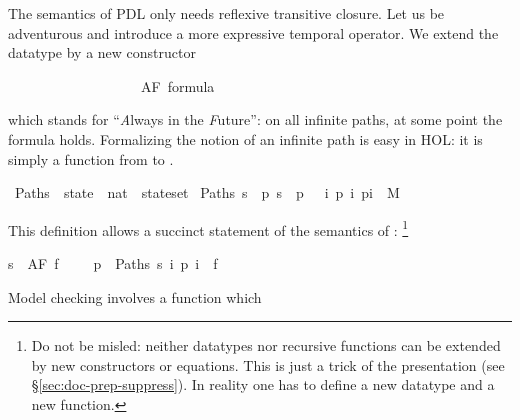 %
\begin{isabellebody}%
\def\isabellecontext{CTL}%
%
\isadelimtheory
%
\endisadelimtheory
%
\isatagtheory
%
\endisatagtheory
{\isafoldtheory}%
%
\isadelimtheory
%
\endisadelimtheory
%
\isamarkuptrue%
%
\begin{isamarkuptext}%
\label{sec:CTL}
%
The semantics of PDL only needs reflexive transitive closure.
Let us be adventurous and introduce a more expressive temporal operator.
We extend the datatype
 by a new constructor%
\end{isamarkuptext}%
\isamarkuptrue%
\ \ \ \ \ \ \ \ \ \ \ \ \ \ \ \ \ \ {\isacharbar}\ AF\ formula%
\begin{isamarkuptext}%
\noindent
which stands for ``\emph{A}lways in the \emph{F}uture'':
on all infinite paths, at some point the formula holds.
Formalizing the notion of an infinite path is easy
in HOL: it is simply a function from  to .%
\end{isamarkuptext}%
\isamarkuptrue%
\isamarkupfalse%
\ Paths\ {\isacharcolon}{\isacharcolon}\ {\isachardoublequoteopen}state\ {\isasymRightarrow}\ {\isacharparenleft}nat\ {\isasymRightarrow}\ state{\isacharparenright}set{\isachardoublequoteclose}\ \isanewline
{\isachardoublequoteopen}Paths\ s\ {\isasymequiv}\ {\isacharbraceleft}p{\isachardot}\ s\ {\isacharequal}\ p\ {}\ {\isasymand}\ {\isacharparenleft}{\isasymforall}i{\isachardot}\ {\isacharparenleft}p\ i{\isacharcomma}\ p{\isacharparenleft}i{\isacharplus}{}{\isacharparenright}{\isacharparenright}\ {\isasymin}\ M{\isacharparenright}{\isacharbraceright}{\isachardoublequoteclose}%
\begin{isamarkuptext}%
\noindent
This definition allows a succinct statement of the semantics of :
\footnote{Do not be misled: neither datatypes nor recursive functions can be
extended by new constructors or equations. This is just a trick of the
presentation (see \S\ref{sec:doc-prep-suppress}). In reality one has to define
a new datatype and a new function.}%
\end{isamarkuptext}%
\isamarkuptrue%
{\isachardoublequoteopen}s\ {\isasymTurnstile}\ AF\ f\ \ \ \ {\isacharequal}\ {\isacharparenleft}{\isasymforall}p\ {\isasymin}\ Paths\ s{\isachardot}\ {\isasymexists}i{\isachardot}\ p\ i\ {\isasymTurnstile}\ f{\isacharparenright}{\isachardoublequoteclose}%
\begin{isamarkuptext}%
\noindent
Model checking  involves a function which

\end{isamarkuptext}
\end{isabellebody}

